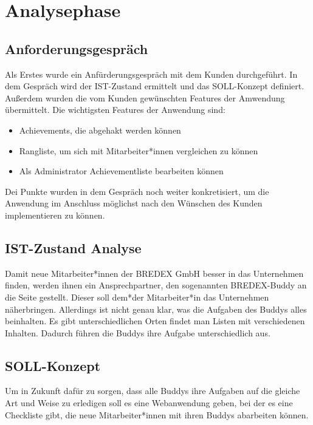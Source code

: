 \documentclass[12pt]{article}
\begin{document}
\section{Analysephase}

\subsection{Anforderungsgespräch}
Als Erstes wurde ein Anfürderungsgespräch mit dem Kunden durchgeführt.
In dem Gespräch wird der IST-Zustand ermittelt und das SOLL-Konzept definiert.
Außerdem wurden die vom Kunden gewünschten Features der Amwendung übermittelt.
Die wichtigsten Features der Anwendung sind:

\begin{itemize}
    \item Achievements, die abgehakt werden können
    \item Rangliste, um sich mit Mitarbeiter*innen vergleichen zu können
    \item Als Administrator Achievementliste bearbeiten können 
\end{itemize}

Dei Punkte wurden in dem Gespräch noch weiter konkretisiert, um die Anwendung
im Anschluss möglichst nach den Wünschen des Kunden implementieren zu können.


\subsection{IST-Zustand Analyse}

Damit neue Mitarbeiter*innen der BREDEX GmbH besser in das Unternehmen
finden, werden ihnen ein Ansprechpartner, den sogenannten BREDEX-Buddy
an die Seite gestellt. Dieser soll dem*der Mitarbeiter*in das Unternehmen
näherbringen. Allerdings ist nicht genau klar, was die Aufgaben des Buddys
alles beinhalten. Es gibt unterschiedlichen Orten findet man Listen mit
verschiedenen Inhalten. 
Dadurch führen die Buddys ihre Aufgabe unterschiedlich aus.


\subsection{SOLL-Konzept}

Um in Zukunft dafür zu sorgen, dass alle Buddys ihre Aufgaben auf die gleiche Art
und Weise zu erledigen soll es eine Webanwendung geben, bei der es eine Checkliste gibt,
die neue Mitarbeiter*innen mit ihren Buddys abarbeiten können.
\end{document}
